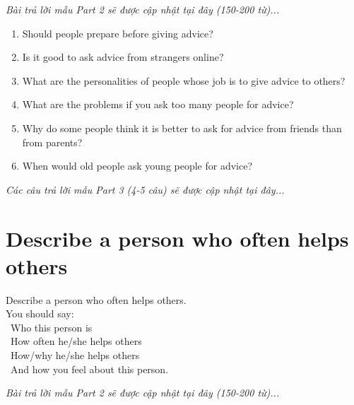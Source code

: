 \vspace{1em}
\textit{Bài trả lời mẫu Part 2 sẽ được cập nhật tại đây (150-200 từ)...}
\vspace{2em}

\begin{ieltsprompt}
\begin{enumerate}[itemsep=4pt]
    \item Should people prepare before giving advice?
    \item Is it good to ask advice from strangers online?
    \item What are the personalities of people whose job is to give advice to others?
    \item What are the problems if you ask too many people for advice?
    \item Why do some people think it is better to ask for advice from friends than from parents?
    \item When would old people ask young people for advice?
\end{enumerate}
\end{ieltsprompt}

\vspace{1em}
\textit{Các câu trả lời mẫu Part 3 (4-5 câu) sẽ được cập nhật tại đây...}
\vspace{2em}

\section{Describe a person who often helps others}
\begin{ieltsprompt}
Describe a person who often helps others. \\
You should say: \\
\textbullet\ Who this person is \\
\textbullet\ How often he/she helps others \\
\textbullet\ How/why he/she helps others \\
\textbullet\ And how you feel about this person. \\
\end{ieltsprompt}

\vspace{1em}
\textit{Bài trả lời mẫu Part 2 sẽ được cập nhật tại đây (150-200 từ)...}
\vspace{2em}

